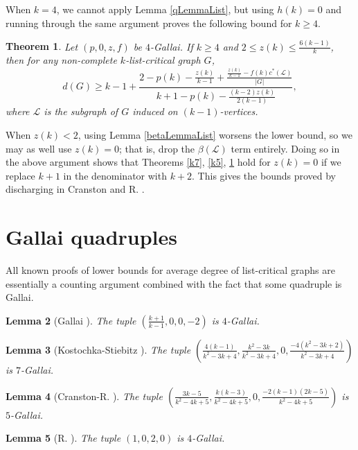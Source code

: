 \documentclass[10pt]{article}
\theoremstyle{plain}
\newtheorem{thm}{Theorem}[section]
\newtheorem{lem}[thm]{Lemma}
\theoremstyle{definition}
\theoremstyle{remark}
\newcommand{\fancy}[1]{\mathcal{#1}}
\renewcommand{\L}{\fancy{L}}
\newcommand{\card}[1]{\left|#1\right|}
\newcommand{\parens}[1]{\left( #1 \right)}
\begin{document}
\noindent When $k=4$, we cannot apply Lemma \ref{qLemmaList}, but using $h(k)=0$ and running through the same argument proves the following bound for $k\ge 4$.
\begin{thm}\label{k4}
	Let $\parens{p,0,z,f}$ be $4$-Gallai.  If $k \ge 4$ and $2 \le z(k) \le \frac{6(k-1)}{k}$, then for any non-complete $k$-list-critical graph $G$,
	\[d(G) \ge k-1 + \frac{2 - p(k) - \frac{z(k)}{k-1} + \frac{\frac{z(k)}{k-1} - f(k)c^*(\L)}{\card{G}}}{k+1 - p(k) - \frac{(k-2)z(k)}{2(k-1)}},\]
	where $\L$ is the subgraph of $G$ induced on $(k-1)$-vertices.
\end{thm}

When $z(k) < 2$, using Lemma \ref{betaLemmaList} worsens the lower bound, so we may as well use $z(k)=0$; that is, drop the $\beta(\L)$ term entirely.  
Doing so in the above argument shows that Theorems \ref{k7}, \ref{k5}, \ref{k4} hold for $z(k) = 0$ if we replace $k+1$ in the denominator with $k+2$.  
This gives the bounds proved by discharging in Cranston and R. \cite{DischargingLowerBound}.

\section{Gallai quadruples}
All known proofs of lower bounds for average degree of list-critical graphs are essentially a counting argument combined with the fact that some quadruple is Gallai.

\begin{lem}[Gallai \cite{gallai1963kritische}]
The tuple $\parens{\frac{k+1}{k-1}, 0, 0, -2}$ is $4$-Gallai.
\end{lem}

\begin{lem}[Kostochka-Stiebitz \cite{kostochkastiebitzedgesincriticalgraph}]
The tuple $\parens{\frac{4(k-1)}{k^2 - 3k + 4}, \frac{k^2 - 3k}{k^2-3k+4}, 0, \frac{-4(k^2-3k+2)}{k^2-3k+4}}$ is $7$-Gallai.
\end{lem}

\begin{lem}[Cranston-R. \cite{DischargingLowerBound}]
The tuple $\parens{\frac{3k-5}{k^2-4k+5}, \frac{k(k-3)}{k^2-4k+5}, 0, \frac{-2(k-1)(2k-5)}{k^2-4k+5}}$ is $5$-Gallai.
\end{lem}

\begin{lem}[R. \cite{Better4ListCriticalBound}]\label{Rbound}
The tuple $\parens{1, 0, 2, 0}$ is $4$-Gallai.
\end{lem}
\end{document}
